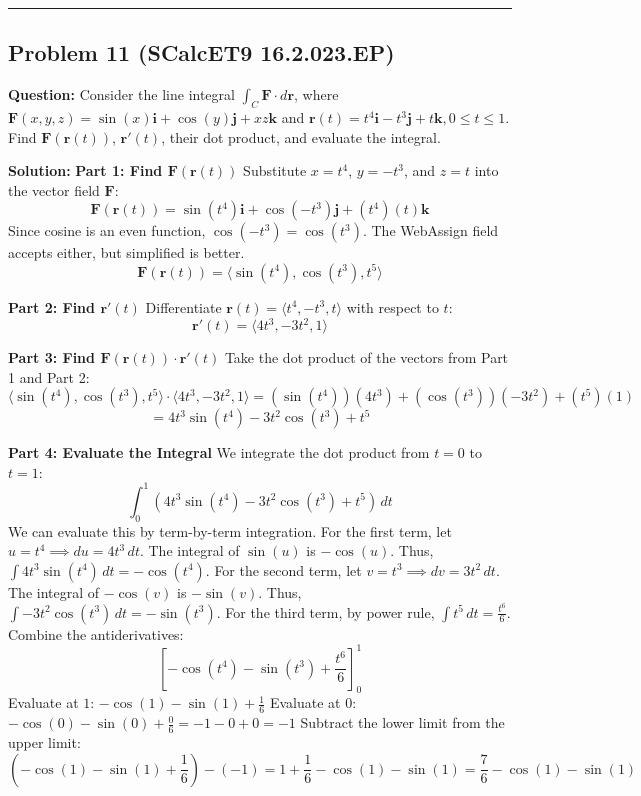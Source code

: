 \documentclass{article}
\begin{document}
\hrule \vspace{0.5cm}

\subsection{Problem 11 (SCalcET9 16.2.023.EP)}
\textbf{Question:} Consider the line integral $\int_C \mathbf{F} \cdot d\mathbf{r}$, where $\mathbf{F}(x,y,z) = \sin(x)\mathbf{i} + \cos(y)\mathbf{j} + xz\mathbf{k}$ and $\mathbf{r}(t) = t^4\mathbf{i} - t^3\mathbf{j} + t\mathbf{k}, 0 \leq t \leq 1$. Find $\mathbf{F}(\mathbf{r}(t))$, $\mathbf{r}'(t)$, their dot product, and evaluate the integral.

\textbf{Solution:}
\textbf{Part 1: Find $\mathbf{F}(\mathbf{r}(t))$}
Substitute $x = t^4$, $y = -t^3$, and $z = t$ into the vector field $\mathbf{F}$:
\[ \mathbf{F}(\mathbf{r}(t)) = \sin(t^4)\mathbf{i} + \cos(-t^3)\mathbf{j} + (t^4)(t)\mathbf{k} \]
Since cosine is an even function, $\cos(-t^3) = \cos(t^3)$. The WebAssign field accepts either, but simplified is better.
\[ \mathbf{F}(\mathbf{r}(t)) = \langle \sin(t^4), \cos(t^3), t^5 \rangle \]

\textbf{Part 2: Find $\mathbf{r}'(t)$}
Differentiate $\mathbf{r}(t) = \langle t^4, -t^3, t \rangle$ with respect to $t$:
\[ \mathbf{r}'(t) = \langle 4t^3, -3t^2, 1 \rangle \]

\textbf{Part 3: Find $\mathbf{F}(\mathbf{r}(t)) \cdot \mathbf{r}'(t)$}
Take the dot product of the vectors from Part 1 and Part 2:
\[ \langle \sin(t^4), \cos(t^3), t^5 \rangle \cdot \langle 4t^3, -3t^2, 1 \rangle = (\sin(t^4))(4t^3) + (\cos(t^3))(-3t^2) + (t^5)(1) \]
\[ = 4t^3\sin(t^4) - 3t^2\cos(t^3) + t^5 \]

\textbf{Part 4: Evaluate the Integral}
We integrate the dot product from $t = 0$ to $t = 1$:
\[ \int_0^1 (4t^3\sin(t^4) - 3t^2\cos(t^3) + t^5) \, dt \]
We can evaluate this by term-by-term integration.
For the first term, let $u = t^4 \implies du = 4t^3 \, dt$. The integral of $\sin(u)$ is $-\cos(u)$. Thus, $\int 4t^3\sin(t^4) \, dt = -\cos(t^4)$.
For the second term, let $v = t^3 \implies dv = 3t^2 \, dt$. The integral of $-\cos(v)$ is $-\sin(v)$. Thus, $\int -3t^2\cos(t^3) \, dt = -\sin(t^3)$.
For the third term, by power rule, $\int t^5 \, dt = \frac{t^6}{6}$.
Combine the antiderivatives:
\[ \left[ -\cos(t^4) - \sin(t^3) + \frac{t^6}{6} \right]_0^1 \]
Evaluate at $1$: $-\cos(1) - \sin(1) + \frac{1}{6}$
Evaluate at $0$: $-\cos(0) - \sin(0) + \frac{0}{6} = -1 - 0 + 0 = -1$
Subtract the lower limit from the upper limit:
\[ \left( -\cos(1) - \sin(1) + \frac{1}{6} \right) - (-1) = 1 + \frac{1}{6} - \cos(1) - \sin(1) = \frac{7}{6} - \cos(1) - \sin(1) \]
\end{document}
